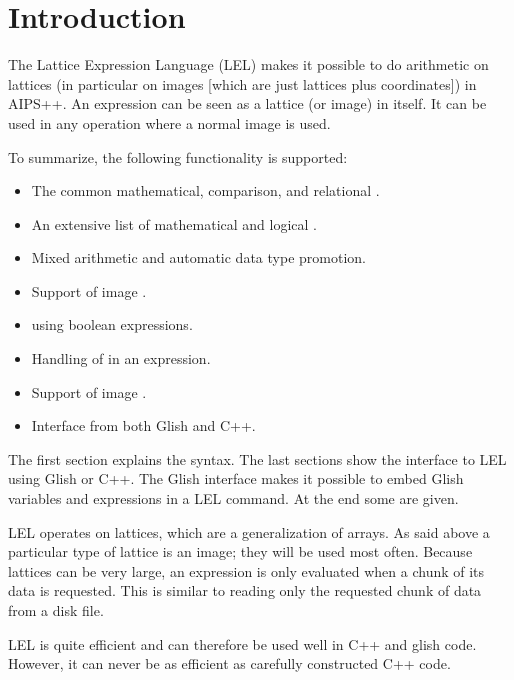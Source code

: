 
\section{Introduction}

The Lattice Expression Language (LEL) makes it possible to do arithmetic
on lattices (in particular on images [which are just lattices plus
coordinates]) in AIPS++.  An expression can be seen as a lattice (or
image) in itself.  It can be used in any operation where a normal image
is used. 

To summarize, the following functionality is supported:
\begin{itemize}
\item The common mathematical, comparison, and relational
      .
\item An extensive list of mathematical and logical
      .
\item Mixed  arithmetic
      and automatic data type promotion.
\item Support of image .
\item {} using boolean expressions.
\item Handling of  in an expression.
\item Support of image .
\item Interface from both Glish and C++.
\end{itemize}

The first section explains the syntax.  The last sections show the
interface to LEL using Glish or C++.  The Glish interface makes it
possible to embed Glish variables and expressions in a LEL command. 
At the end some  are given.

\medskip\noindent LEL operates on lattices, which are a generalization
of arrays.  As said
above a particular type of lattice is an image; they will be used most
often.  Because lattices can be very large, an expression is only
evaluated when a chunk of its data is requested.  This is similar to
reading only the requested chunk of data from a disk file. 

\medskip\noindent LEL is quite efficient and can therefore be used
well in C++ and glish
code.  However, it can never be as efficient as carefully constructed
C++ code. 


